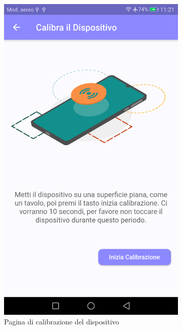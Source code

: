 \begin{figure}
\begin{subfigure}[b]{0.33\textwidth}
      \includegraphics[width=\textwidth]{figures/screenshot/calibrate.png}
      \caption{Pagina di calibrazione del dispositivo}
      \label{fig:calibrate}
  \end{subfigure}
  \vfill
  \begin{subfigure}[b]{0.33\textwidth}

\end{subfigure}
\end{figure}
